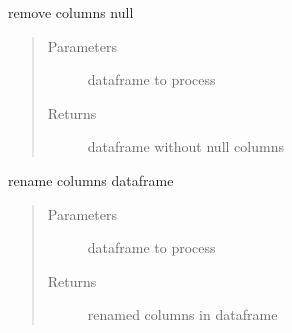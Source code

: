\documentclass[letterpaper,10pt,english]{sphinxmanual}
\begin{document}

\begin{fulllineitems}
\label{\detokenize{algorithms:algorithms.idp.idp_utils.remove_null_columns}}
\sphinxAtStartPar
remove columns null
\begin{quote}\begin{description}
\item[{Parameters}] \leavevmode
\sphinxAtStartPar
{} \textendash{} dataframe to process

\item[{Returns}] \leavevmode
\sphinxAtStartPar
dataframe without null columns

\end{description}\end{quote}

\end{fulllineitems}


\begin{fulllineitems}
\label{\detokenize{algorithms:algorithms.idp.idp_utils.rename_columns}}
\sphinxAtStartPar
rename columns dataframe
\begin{quote}\begin{description}
\item[{Parameters}] \leavevmode
\sphinxAtStartPar
{} \textendash{} dataframe to process

\item[{Returns}] \leavevmode
\sphinxAtStartPar
renamed columns in dataframe

\end{description}\end{quote}

\end{fulllineitems}

\end{document}
